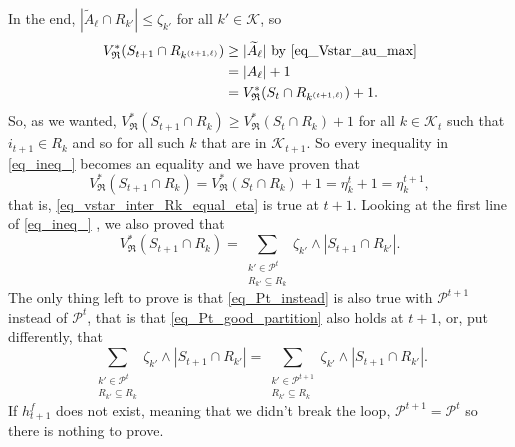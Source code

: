 \documentclass[
  11pt,
  a4paper,
]{article}
\theoremstyle{plain}
\theoremstyle{definition}
\theoremstyle{plain}
\theoremstyle{definition}
\theoremstyle{plain}
\theoremstyle{remark}
\begin{document}
In the end, \(|\widetilde A_\ell \cap R_{k'} |\leq \zeta_{k'}\) for all
\(k'\in\mathcal{K}\), so \begin{align*}
V^*_{\mathfrak{R}}( S_{t+1}\cap R_{k^{(t+1,\ell)}})&\geq | \widetilde A_\ell | \text{ by \eqref{eq_Vstar_au_max}}\\
&=  |  A_\ell | +1\\
&= V^*_{\mathfrak{R}}( S_{t}\cap R_{k^{(t+1,\ell)}}) +1.
\end{align*} So, as we wanted,
\(V^*_{\mathfrak{R}}(S_{t+1}\cap R_k)\geq V^*_{\mathfrak{R}}(S_{t}\cap R_k)+1\)
for all \(k\in\mathcal{K}_{t}\) such that \(i_{t+1}\in R_k\) and so for
all such \(k\) that are in \(\mathcal{K}_{t+1}\). So every inequality in
\eqref{eq_ineq_} becomes an equality and we have proven that
\begin{equation*}
V^*_{\mathfrak{R}}(S_{t+1}\cap R_k) = V^*_{\mathfrak{R}}(S_{t}\cap R_k)+1 =\eta^t_k+1= \eta^{t+1}_k,
\end{equation*} that is, \eqref{eq_vstar_inter_Rk_equal_eta} is true at
\(t+1\). Looking at the first line of \eqref{eq_ineq_} , we also proved
that \begin{equation}
V^*_{\mathfrak{R}}(S_{t+1}\cap R_k) =  \sum_{\substack{k'\in\mathcal{P}^{t}\\R_{k'}\subseteq R_k}} \zeta_{k'}\wedge |S_{t+1}\cap R_{k'}| . \label{eq_Pt_instead}
\end{equation} The only thing left to prove is that
\eqref{eq_Pt_instead} is also true with \(\mathcal{P}^{t+1}\) instead of
\(\mathcal{P}^{t}\), that is that \eqref{eq_Pt_good_partition} also
holds at \(t+1\), or, put differently, that
\begin{equation}\label{eq_last_goal}
\sum_{\substack{k'\in\mathcal{P}^{t}\\R_{k'}\subseteq R_k}} \zeta_{k'}\wedge |S_{t+1}\cap R_{k'}|=\sum_{\substack{k'\in\mathcal{P}^{t+1}\\R_{k'}\subseteq R_k}} \zeta_{k'}\wedge |S_{t+1}\cap R_{k'}|.
\end{equation} If \(h^f_{t+1}\) does not exist, meaning that we didn't
break the loop, \(\mathcal{P}^{t+1}=\mathcal{P}^t\) so there is nothing
to prove.
\end{document}

